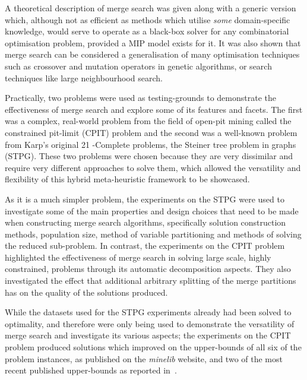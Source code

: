 \documentclass[journal]{IEEEtran}
\begin{document}
A theoretical description of merge search was given along with a generic version which, although not as efficient as methods which utilise \emph{some} domain-specific knowledge, would serve to operate as a black-box solver for any combinatorial optimisation problem, provided a MIP model exists for it. It was also shown that merge search can be considered a generalisation of many optimisation techniques such as crossover and mutation operators in genetic algorithms, or search techniques like large neighbourhood search.

Practically, two problems were used as testing-grounds to demonstrate the effectiveness of merge search and explore some of its features and facets. The first was a complex, real-world problem from the field of open-pit mining called the constrained pit-limit (CPIT) problem and the second was a well-known problem from Karp's original 21 \NP-Complete problems, the Steiner tree problem in graphs (STPG). These two problems were chosen because they are very dissimilar and require very different approaches to solve them, which allowed the versatility and flexibility of this hybrid meta-heuristic framework to be showcased.

As it is a much simpler problem, the experiments on the STPG were used to investigate some of the main properties and design choices that need to be made when constructing merge search algorithms, specifically solution construction methods, population size, method of variable partitioning and methods of solving the reduced sub-problem. In contrast, the experiments on the CPIT problem highlighted the effectiveness of merge search in solving large scale, highly constrained, problems through its automatic decomposition aspects. They also investigated the effect that additional arbitrary splitting of the merge partitions has on the quality of the solutions produced.

While the datasets used for the STPG experiments already had been solved to optimality, and therefore were only being used to demonstrate the versatility of merge search and investigate its various aspects; the experiments on the CPIT problem produced solutions which improved on the upper-bounds of all six of the problem instances, as published on the \emph{minelib} website, and two of the most recent published upper-bounds as reported in~\cite{minelib-improved}.

\smallskip
\end{document}
